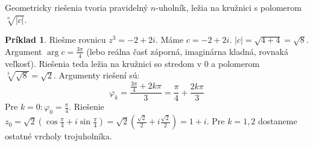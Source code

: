 \documentclass[11pt,a4paper]{article}
\theoremstyle{definition}
\newtheorem{priklad}[definicia]{Príklad}
\theoremstyle{plain}
\theoremstyle{remark}
\begin{document}
Geometricky riešenia tvoria pravidelný $n$-uholník, ležia na kružnici s polomerom $\sqrt[n]{|c|}$.

\begin{priklad}
Riešme rovnicu $z^3 = -2 + 2i$.
Máme $c = -2+2i$. $|c| = \sqrt{4+4} = \sqrt{8}$.
Argument $\arg c = \frac{3\pi}{4}$ (lebo reálna časť záporná, imaginárna kladná, rovnaká veľkosť).
Riešenia teda ležia na kružnici so stredom v 0 a polomerom $\sqrt[3]{\sqrt{8}} = \sqrt{2}$.
Argumenty riešení sú:
$$ \varphi_k = \frac{\frac{3\pi}{4} + 2k\pi}{3} = \frac{\pi}{4} + \frac{2k\pi}{3} $$
Pre $k=0: \varphi_0 = \frac{\pi}{4}$. Riešenie $z_0 = \sqrt{2}(\cos \frac{\pi}{4} + i \sin \frac{\pi}{4}) = \sqrt{2}(\frac{\sqrt{2}}{2} + i\frac{\sqrt{2}}{2}) = 1+i$.
Pre $k=1, 2$ dostaneme ostatné vrcholy trojuholníka.
\end{priklad}
\end{document}
